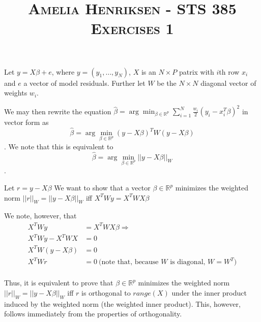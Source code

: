 \documentclass[12pt]{article}
\newcommand{\R}{\mathbb{R}}
\newenvironment{problem}[2][Exercise]{\begin{trivlist}
\item[\hskip \labelsep {\bfseries #1}\hskip \labelsep {\bfseries #2.}]}{\end{trivlist}}
\begin{document}
\author{}
\title{\normalsize \flushright \textsc{Amelia Henriksen - STS 385  Exercises 1 }}%
\date{}
\vspace{-1cm}
\maketitle
\vspace{-1cm}

\begin{problem}{A}
Let $y = X\beta + e$, where $y = (y_1, \ldots, y_N)$, $X$ is an $N \times P$ patrix with $i$th row $x_i$ and $e$ a vector of model residuals.
Further let $W$ be the $N \times N$ diagonal vector of weights $w_i$.

We may then rewrite the equation $\hat{\beta} = \arg \min_{\beta \in \R^p} \sum_{i=1}^{N} \frac{w_i}{2}(y_i - x_i^T \beta)^2$ in vector form as 
$$ \hat{\beta} = \arg \min_{\beta \in \R^p} (y - X\beta)^T W (y-X\beta)$$.
We note that this is equivalent to 
$$\hat{\beta} = \arg \min_{\beta \in \R^p} || y - X\beta||_W$$.

Let $r = y - X\beta$
We want to show that a vector $\beta \in \R^p$ minimizes the weighted norm $||r||_W = || y - X\beta||_W$ iff $X^TWy = X^TWX\beta$

We note, however, that 
\begin{align*}
X^TWy &= X^TWX\beta \Rightarrow\\
X^TWy - X^TWX &= 0\\
X^TW(y - X\beta) &= 0\\
X^TWr &= 0 \ \text{(note that, because $W$ is diagonal, $W = W^T$)}\\
\end{align*}

Thus, it is equivalent to prove that  $\beta \in \R^p$ minimizes the weighted norm $||r||_W = || y - X\beta||_W$ iff $r$ is orthogonal to $range(X)$ under the inner product induced by the weighted norm (the weighted inner product). This, however, follows immediately from the properties of orthogonality.


\end{problem}
\end{document}
